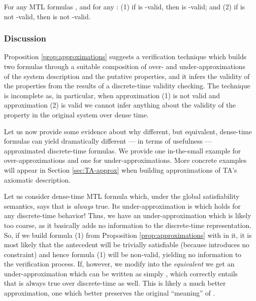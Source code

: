 \documentclass[a4paper]{article}
\theoremstyle{plain}
\theoremstyle{definition}
\begin{document}
\begin{proposition} \label{prop:approximations}
  For any MTL formulas , and for any :
  (1) if  is -valid,
		    then  is -valid;
and (2) if  is not -valid,
		    then  is not -valid.
\end{proposition}



\subsubsection{Discussion}
Proposition \ref{prop:approximations} suggests a verification technique which builds two formulas through a suitable composition of over- and under-ap\-prox\-i\-ma\-tions of the system description and the putative properties, and it infers the validity of the properties from the results of a discrete-time validity checking.
The technique is incomplete as, in particular, when approximation (1) is not valid and approximation (2) is valid we cannot infer anything about the validity of the property in the original system over dense time.

Let us now provide some evidence about why different, but equivalent, dense-time formulas can yield dramatically different --- in terms of usefulness --- approximated discrete-time formulas.
We provide one in-the-small example for over-ap\-prox\-i\-ma\-tions and one for under-ap\-prox\-i\-ma\-tions.
More concrete examples will appear in Section \ref{sec:TA-approx} when building approximations of TA's axiomatic description.

Let us consider dense-time MTL formula  which, under the global satisfiability semantics, says that  is \emph{always} true.
Its under-ap\-prox\-i\-ma\-tion is  which holds for any discrete-time behavior!
Thus, we have an under-ap\-prox\-i\-ma\-tion which is likely too coarse, as it basically adds no information to the discrete-time representation.
So, if we build formula (1) from Proposition \ref{prop:approximations} with  in it, it is most likely that the antecedent will be trivially satisfiable (because  introduces no constraint) and hence formula (1) will be non-valid, yielding no information to the verification process.
If, however, we modify  into the \emph{equivalent}  we get an under-ap\-prox\-i\-ma\-tion which can be written as simply , which correctly entails that  is always true over discrete-time as well.
This is likely a much better approximation, one which better preserves the original ``meaning'' of .
\end{document}
